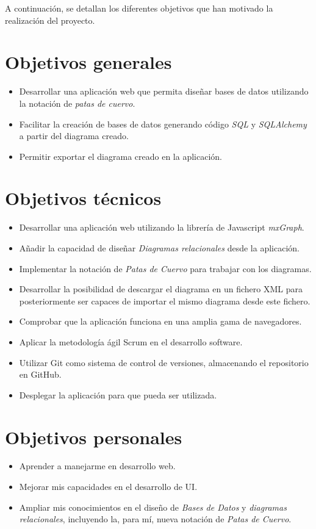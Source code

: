 
A continuación, se detallan los diferentes objetivos que han motivado la realización del proyecto.

\section{Objetivos generales}
\begin{itemize}
    \item Desarrollar una aplicación web que permita diseñar bases de datos utilizando la notación de \emph{patas de cuervo}.
    \item Facilitar la creación de bases de datos generando código \emph{SQL} y \emph{SQLAlchemy} a partir del diagrama creado.
    \item Permitir exportar el diagrama creado en la aplicación.
\end{itemize}

\section{Objetivos técnicos}
\begin{itemize}
    \item Desarrollar una aplicación web utilizando la librería de Javascript \emph{mxGraph}.
    \item Añadir la capacidad de diseñar \emph{Diagramas relacionales} desde la aplicación.
    \item Implementar la notación de \emph{Patas de Cuervo} para trabajar con los diagramas.
    \item Desarrollar la posibilidad de descargar el diagrama en un fichero XML para posteriormente ser capaces de importar el mismo diagrama desde este fichero.
    \item Comprobar que la aplicación funciona en una amplia gama de navegadores.
    \item Aplicar la metodología ágil Scrum en el desarrollo software.
    \item Utilizar Git como sistema de control de versiones, almacenando el repositorio en GitHub.
    \item Desplegar la aplicación para que pueda ser utilizada.
\end{itemize}

\section{Objetivos personales}
\begin{itemize}
    \item Aprender a manejarme en desarrollo web.
    \item Mejorar mis capacidades en el desarrollo de UI.
    \item Ampliar mis conocimientos en el diseño de \emph{Bases de Datos} y \emph{diagramas relacionales}, incluyendo la, para mí, nueva notación de \emph{Patas de Cuervo}.
\end{itemize}